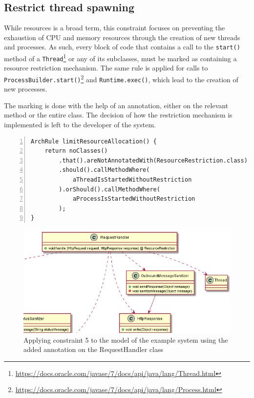 \subsection{Restrict thread spawning}
While resources is a broad term, this constraint focuses on preventing the exhaustion of CPU and memory resources through the creation of new threads and processes. As such, every block of code that contains a call to the \texttt{start()} method of a \texttt{Thread}\footnote{\url{https://docs.oracle.com/javase/7/docs/api/java/lang/Thread.html}} or any of its subclasses, must be marked as containing a resource restriction mechanism. The same rule is applied for calls to \texttt{ProcessBuilder.start()}\footnote{\url{https://docs.oracle.com/javase/7/docs/api/java/lang/Process.html}\label{fnt:java_process}} and \texttt{Runtime.exec()}, which lead to the creation of new processes.

The marking is done with the help of an annotation, either on the relevant method or the entire class. The decision of how the restriction mechanism is implemented is left to the developer of the system.

\begin{minipage}{\linewidth}
\begin{lstlisting}[caption={Rule definition for constraint 5.}, captionpos=b, label=lst:constraint_5_impl, numbers=left]
ArchRule limitResourceAllocation() {
    return noClasses()
        .that().areNotAnnotatedWith(ResourceRestriction.class)
        .should().callMethodWhere(
            aThreadIsStartedWithoutRestriction
        ).orShould().callMethodWhere(
            aProcessIsStartedWithoutRestriction
        );
}
\end{lstlisting}
\end{minipage}


\begin{figure}
    \centering
    \includegraphics[width=\linewidth]{figure/toyexamples/resource_restriction.png}
    \caption{Applying constraint 5 to the model of the example system using the added annotation on the RequestHandler class}
    \label{fig:toy_resource_restriction}
\end{figure}





